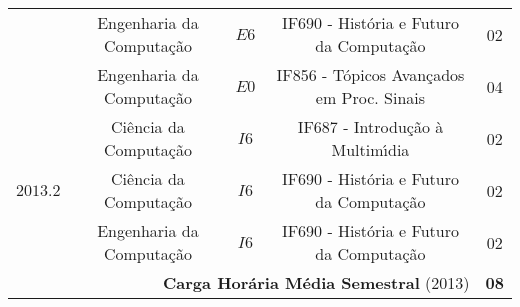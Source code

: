 \begin{table}[!htpb]
\begin{tabular}{ccccc}
  & Engenharia da Computa\c{c}\~{a}o & $E6$ & IF690 - Hist\'{o}ria e Futuro da Computa\c{c}\~{a}o & 02\\
  & Engenharia da Computa\c{c}\~{a}o & $E0$ & IF856 - T\'{o}picos Avan\c{c}ados em Proc. Sinais & 04\\
\cmidrule{1-5}
& Ci\^{e}ncia da Computa\c{c}\~{a}o & $I6$ & IF687 - Introdu\c{c}\~{a}o \`{a} Multim\'{\i}dia & 02\\
$2013.2$ & Ci\^{e}ncia da Computa\c{c}\~{a}o & $I6$ & IF690 - Hist\'{o}ria e Futuro da Computa\c{c}\~{a}o & 02\\
  & Engenharia da Computa\c{c}\~{a}o & $I6$ & IF690 - Hist\'{o}ria e Futuro da Computa\c{c}\~{a}o & 02\\
\cmidrule{1-5}
\multicolumn{4}{r}{\textbf{Carga Hor\'{a}ria M\'{e}dia Semestral} (2013)} & \textbf{08} \\
\bottomrule
\end{tabular}
\label{Tab:Disc_Grad}
\end{table}